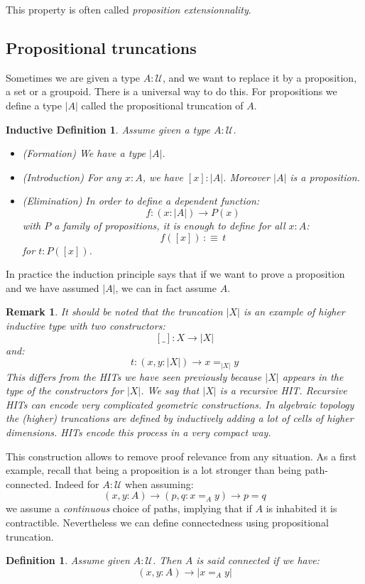 \documentclass{article}
\newcommand{\sse}[1]{\medbreak \subsection{#1}}
\newcommand{\U}{{\mathcal U}}
\renewcommand{\r}{\rightarrow}
\newtheorem{definition}{Definition}
\newtheorem{remark}{Remark}
\newtheorem{ind_def}{Inductive Definition}
\begin{document}
This property is often called \emph{proposition extensionnality}.


\sse{Propositional truncations}

Sometimes we are given a type $A:\U$, and we want to replace it by a proposition, a set or a groupoid. There is a universal way to do this. For propositions we define a type $|A|$ called the propositional truncation of $A$.

\begin{ind_def}
Assume given a type $A:\U$.
\begin{itemize}
\item (Formation) We have a type $|A|$.
\item (Introduction) For any $x:A$, we have $[x]:|A|$. Moreover $|A|$ is a proposition.
\item (Elimination) In order to define a dependent function: 
\[f:(x:|A|) \r P(x)\]
with $P$ a family of propositions, it is enough to define for all $x:A$:
\[f([x])\, :\equiv \, t\]
for $t:P([x])$.
\end{itemize}
\end{ind_def}

In practice the induction principle says that if we want to prove a proposition and we have assumed $|A|$, we can in fact assume $A$. 

\begin{remark}
It should be noted that the truncation $|X|$ is an example of higher inductive type with two constructors:
\[[\_] : X\r |X|\]
and: 
\[t: (x,y:|X|) \r x=_{|X|} y\]
This differs from the HITs we have seen previously because $|X|$ appears in the type of the constructors for $|X|$. We say that $|X|$ is a recursive HIT. Recursive HITs can encode very complicated geometric constructions. In algebraic topology the (higher) truncations are defined by inductively adding a lot of cells of higher dimensions. HITs encode this process in a very compact way.
\end{remark} 


This construction allows to remove proof relevance from any situation. As a first example, recall that being a proposition is a lot stronger than being path-connected. Indeed for $A:\U$ when assuming:
\[(x,y:A)\r (p,q:x=_Ay)\r p=q\]
we assume a \emph{continuous} choice of paths, implying that if $A$ is inhabited it is contractible. Nevertheless we can define connectedness using propositional truncation.

\begin{definition}
Assume given $A:\U$. Then $A$ is said connected if we have:
\[(x,y:A)\r |x=_Ay|\]
\end{definition}
\end{document}
